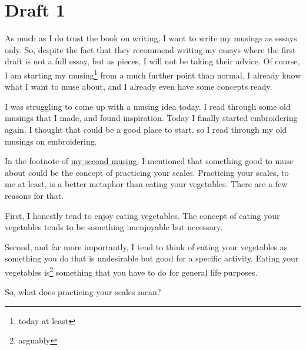 \documentclass[12pt]{article}[titlepage]
\newcommand{\1}{\={a}}
\newcommand{\2}{\={e}}
\newcommand{\3}{\={\i}}
\newcommand{\4}{\=o}
\newcommand{\5}{\=u}
\newcommand{\6}{\={A}}
\renewcommand{\,}{\textsuperscript{,}}
\begin{document}
\section{Draft 1}
As much as I do trust the book on writing, I want to write my musings as essays only.
So, despite the fact that they recommend writing my essays where the first draft is not a full essay, but as pieces, I will not be taking their advice.
Of course, I am starting my musing\footnote{today at least} from a much further point than normal.
I already know what I want to muse about, and I already even have some concepts ready.

I was struggling to come up with a musing idea today.
I read through some old musings that I made, and found inspiration.
Today I finally started embroidering again.
I thought that could be a good place to start, so I read through my old musings on embroidering.

In the footnote of \href{embroidery-2.html}{my second musing}, I mentioned that something good to muse about could be the concept of practicing your scales.
Practicing your scales, to me at least, is a better metaphor than eating your vegetables.
There are a few reasons for that.

First, I honestly tend to enjoy eating vegetables.
The concept of eating your vegetables tends to be something unenjoyable but necessary.

Second, and far more importantly, I tend to think of eating your vegetables as something you do that is undesirable but good for a specific activity.
Eating your vegetables is\footnote{arguably} something that you have to do for general life purposes.

So, what does practicing your scales mean?
\end{document}
